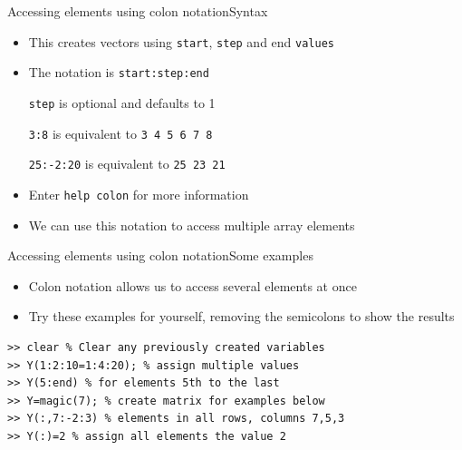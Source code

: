 \documentclass{beamer}
\begin{document}
\begin{frame}{Accessing elements using colon notation}{Syntax}
	\begin{itemize}
		\item This creates vectors using \texttt{start}, \texttt{step} and end \texttt{values}
		\item The notation is \texttt{start:step:end}

		\texttt{step} is optional and defaults to 1
		
		\texttt{3:8} is equivalent to \texttt{3 4 5 6 7 8}
		
		\texttt{25:-2:20} is equivalent to \texttt{25 23 21}
		\item Enter \texttt{help colon} for more information
		\item We can use this notation to access multiple array elements
	\end{itemize}
\end{frame}

\begin{frame}[fragile]{Accessing elements using colon notation}{Some examples}
	\begin{itemize}
		\item Colon notation allows us to access several elements at once 
		\item Try these examples for yourself, removing the semicolons to show the results
	\end{itemize}
	
	\begin{lstlisting}[style=Matlab-editor,basicstyle=\footnotesize]
>> clear % Clear any previously created variables
>> Y(1:2:10=1:4:20); % assign multiple values
>> Y(5:end) % for elements 5th to the last
>> Y=magic(7); % create matrix for examples below
>> Y(:,7:-2:3) % elements in all rows, columns 7,5,3
>> Y(:)=2 % assign all elements the value 2
	\end{lstlisting}
\end{frame}
\end{document}
